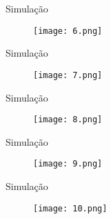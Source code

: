 \begin{frame}{Simulação}

  \begin{figure}[ht]
    \begin{minipage}[b]{0.35\linewidth}
      \centering
      \texttt{[image: 6.png]}
    \end{minipage}

  \end{figure}

\end{frame}

\begin{frame}{Simulação}

  \begin{figure}[ht]
    \begin{minipage}[b]{0.35\linewidth}
      \centering
      \texttt{[image: 7.png]}
    \end{minipage}

  \end{figure}

\end{frame}

\begin{frame}{Simulação}

  \begin{figure}[ht]
    \begin{minipage}[b]{0.35\linewidth}
      \centering
      \texttt{[image: 8.png]}
    \end{minipage}

  \end{figure}

\end{frame}

\begin{frame}{Simulação}

  \begin{figure}[ht]
    \begin{minipage}[b]{0.35\linewidth}
      \centering
      \texttt{[image: 9.png]}
    \end{minipage}

  \end{figure}

\end{frame}

\begin{frame}{Simulação}

  \begin{figure}[ht]
    \begin{minipage}[b]{0.35\linewidth}
      \centering
      \texttt{[image: 10.png]}
    \end{minipage}

  \end{figure}

\end{frame}

